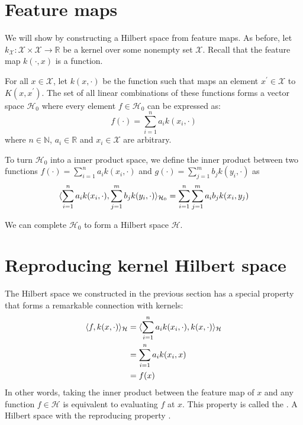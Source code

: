 \section{Feature maps}
We will show  by constructing a Hilbert space from feature maps. As before, let $k_\mathcal{X} : \mathcal{X} \times \mathcal{X} \to \mathbb{R}$ be a kernel over some nonempty set $\mathcal{X}$. Recall that the feature map $k(\cdot, x)$ is a function.

For all $x \in \mathcal{X}$, let $k(x, \cdot)$ be the function such that maps an element $x^\prime \in \mathcal{X}$ to $K(x, x^\prime)$. The set of all linear combinations of these functions forms a vector space $\mathcal{H}_0$ where every element $f \in \mathcal{H}_0$ can be expressed as:
%
\begin{equation}
  f(\cdot) = \sum_{i=1}^n a_i k(x_i, \cdot)
\end{equation}
%
where $n \in \mathbb{N}$, $a_i \in \mathbb{R}$ and $x_i \in \mathcal{X}$ are arbitrary.

To turn $\mathcal{H}_0$ into a inner product space, we define the inner product between two functions $f(\cdot) = \sum_{i=1}^n a_i k(x_i, \cdot)$ and $g(\cdot) = \sum_{j=1}^m b_j k(y_i, \cdot)$ as
%
\begin{equation}
  \langle\sum_{i=1}^n a_i k(x_i, \cdot), \sum_{j=1}^m b_j k(y_i, \cdot)\rangle_{\mathcal{H}_0} = \sum_{i=1}^n \sum_{j=1}^m a_i b_j k(x_i, y_j)
\end{equation}

We can complete $\mathcal{H}_0$ to form a Hilbert space $\mathcal{H}$.

\section{Reproducing kernel Hilbert space}
The Hilbert space we constructed in the previous section has a special property that forms a remarkable connection with kernels:
%
\begin{align}
  \langle f, k(x, \cdot)\rangle_{\mathcal{H}}
  &= \langle\sum_{i=1}^n a_i k(x_i, \cdot), k(x, \cdot)\rangle_{\mathcal{H}} \\
  &= \sum_{i=1}^n a_i k(x_i, x) \\
  &= f(x)
\end{align}
%
In other words, taking the inner product between the feature map of $x$ and any function $f \in \mathcal{H}$ is equivalent to evaluating $f$ at $x$. This property is called the . A Hilbert space with the reproducing property .

